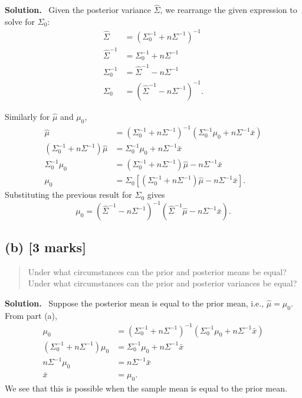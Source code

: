 \documentclass{article}
\newenvironment{question}{\begin{quote}\small}{\end{quote}}
\newcommand{\solution}{\noindent\textbf{Solution.}\ }
\begin{document}
\solution
Given the posterior variance $\hat\Sigma$, we rearrange the given expression to solve for $\Sigma_0$:
\begin{align*}
    \hat\Sigma &= (\Sigma_0^{-1} + n\Sigma^{-1})^{-1} \\
    \hat\Sigma^{-1} &= \Sigma_0^{-1} + n\Sigma^{-1} \\
    \Sigma_0^{-1} &= \hat\Sigma^{-1} - n\Sigma^{-1} \\
    \Sigma_0 &= (\hat\Sigma^{-1} - n\Sigma^{-1})^{-1}.
\end{align*}

Similarly for $\hat\mu$ and $\mu_0$,
\begin{align*}
    \hat\mu &= (\Sigma_0^{-1} + n\Sigma^{-1})^{-1} (\Sigma_0^{-1} \mu_0 + n\Sigma^{-1} \bar{x}) \\
    (\Sigma_0^{-1} + n\Sigma^{-1}) \hat\mu &= \Sigma_0^{-1} \mu_0 + n\Sigma^{-1} \bar{x} \\
     \Sigma_0^{-1} \mu_0 &= (\Sigma_0^{-1} + n\Sigma^{-1}) \hat\mu - n\Sigma^{-1} \bar{x} \\
     \mu_0 &= \Sigma_0 [(\Sigma_0^{-1} + n\Sigma^{-1}) \hat\mu - n\Sigma^{-1} \bar{x}].
\end{align*}
Substituting the previous result for $\Sigma_0$ gives
\[
    \mu_0 = (\hat\Sigma^{-1} - n\Sigma^{-1})^{-1} (\hat\Sigma^{-1} \hat\mu - n\Sigma^{-1} \bar{x}).
\]

\subsection*{(b) [3 marks]}

\begin{question}
Under what circumstances can the prior and posterior means be equal? Under what circumstances can the prior and posterior variances be equal?
\end{question}

\solution
Suppose the posterior mean is equal to the prior mean, i.e., $\hat\mu = \mu_0$.
From part (a),
\begin{align*}
    \mu_0 &= (\Sigma_0^{-1} + n\Sigma^{-1})^{-1} (\Sigma_0^{-1} \mu_0 + n\Sigma^{-1} \bar{x}) \\
     (\Sigma_0^{-1} + n\Sigma^{-1}) \mu_0 &= \Sigma_0^{-1} \mu_0 + n\Sigma^{-1} \bar{x} \\
     n\Sigma^{-1} \mu_0 &= n\Sigma^{-1} \bar{x} \\
    \bar{x} &= \mu_0.
\end{align*}
We see that this is possible when the sample mean is equal to the prior mean.
\end{document}
